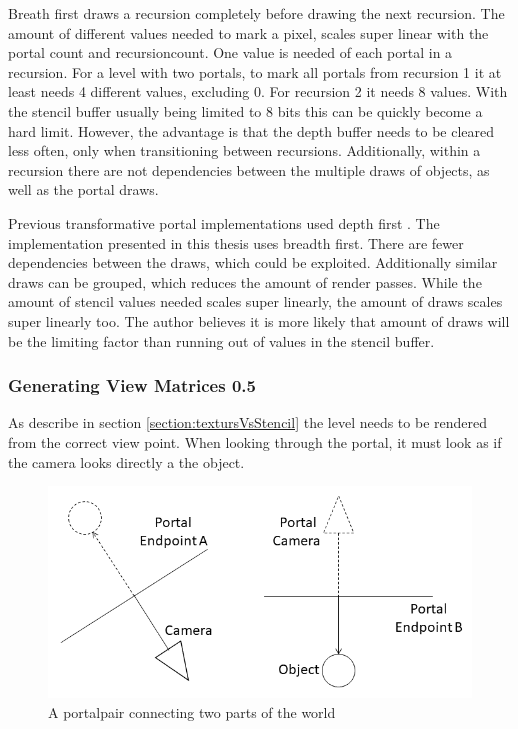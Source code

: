 Breath first draws a recursion completely before drawing the next recursion. The amount of different values needed to mark a pixel, scales super linear with the portal count and \gls{recursioncount}. One value is needed of each portal in a recursion. For a level with two portals, to mark all portals from recursion 1 it at least needs 4 different values, excluding 0. For recursion 2 it needs 8 values. With the stencil buffer usually being limited to 8 bits this can be quickly become a hard limit. However, the advantage is that the depth buffer needs to be cleared less often, only when transitioning between recursions. Additionally, within a recursion there are not dependencies between the multiple draws of objects, as well as the portal draws.

Previous transformative portal implementations used depth first \cite{lowe:2005:technique,lecture:portalProblems}. The implementation presented in this thesis uses breadth first. There are fewer dependencies between the draws, which could be exploited. Additionally similar draws can be grouped, which reduces the amount of render passes. While the amount of stencil values needed scales super linearly, the amount of draws scales super linearly too. The author believes it is more likely that amount of draws will be the limiting factor than running out of values in the stencil buffer.



\subsubsection{Generating View Matrices 0.5}
\label{section:generatingviewmatrices}


As describe in section \ref{section:textursVsStencil} the level needs to be rendered from the correct view point. When looking through the portal, it must look as if the camera looks directly a the object.

\begin{figure}[H]
	\includegraphics[width=\linewidth]{images/portal.png}
	\caption{A \gls{portalpair} connecting two parts of the world}
	\label{fig:portal}
\end{figure}

